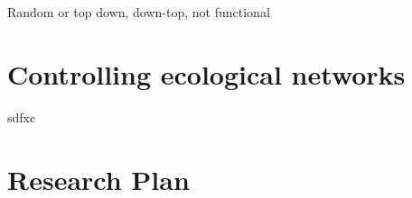 \documentclass[a4paper]{report}
\begin{document}
Random or top down, down-top, not functional

\chapter*{Controlling ecological networks}

sdfxc

\chapter*{Research Plan}

\footnotesize
\twocolumn

\end{document}
